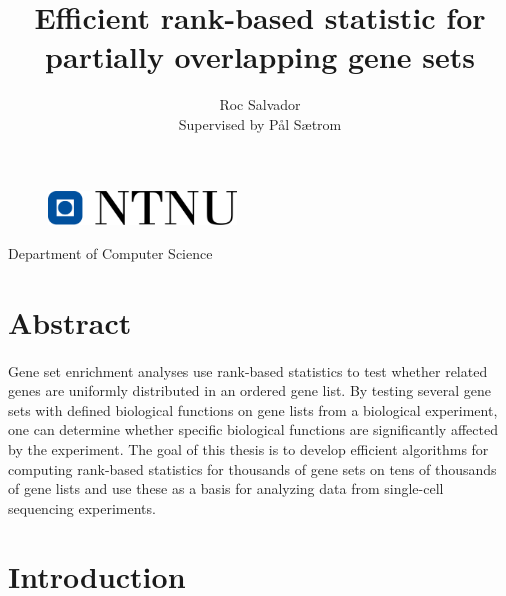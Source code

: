 \documentclass[12pt]{extarticle}
\begin{document}
\author{Roc Salvador \\ Supervised by Pål Sætrom}

\title{\bfseries Efficient rank-based statistic for partially overlapping gene sets}

\maketitle


\vspace{9cm}

\begin{figure}[H]
    \centering
    \includegraphics[width=5cm]{img/ntnu.png}
\end{figure}

\begin{center}

Department of Computer Science

\end{center}


\newpage

\tableofcontents

\newpage


\section{Abstract}

\paragraph{} Gene set enrichment analyses use rank-based statistics to test whether related genes are uniformly distributed in an ordered gene list. By testing several gene sets with defined biological functions on gene lists from a biological experiment, one can determine whether specific biological functions are significantly affected by the experiment. The goal of this thesis is to develop efficient algorithms for computing rank-based statistics for thousands of gene sets on tens of thousands of gene lists and use these as a basis for analyzing data from single-cell sequencing experiments. \cite{triumphs-limitattions-scRNA-seq} \cite{gsea}

\newpage

\section{Introduction}
\end{document}
